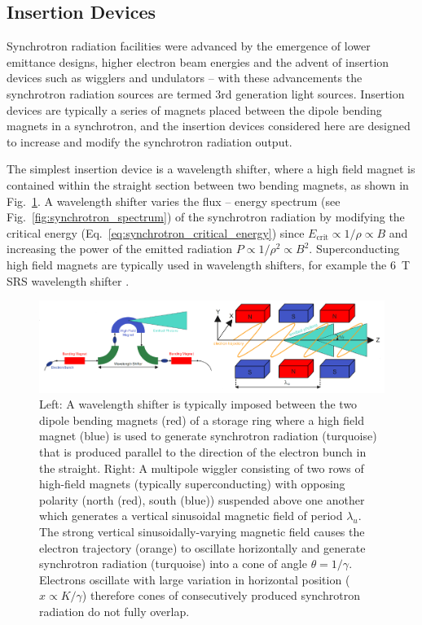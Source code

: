 \documentclass[../main.tex]{subfiles}
\begin{document}
\subsection{Insertion Devices}

Synchrotron radiation facilities were advanced by the emergence of lower emittance designs, higher electron beam energies and the advent of insertion devices such as wigglers and undulators -- with these advancements the synchrotron radiation sources are termed 3rd generation light sources. Insertion devices are typically a series of magnets placed between the dipole bending magnets in a synchrotron, and the insertion devices considered here are designed to increase and modify the synchrotron radiation output. 

The simplest insertion device is a wavelength shifter, where a high field magnet is contained within the straight section between two bending magnets, as shown in Fig.~\ref{fig:wavelength_shifter_wiggler}. A wavelength shifter varies the flux -- energy spectrum (see Fig.~\ref{fig:synchrotron_spectrum}) of the synchrotron radiation by modifying the critical energy (Eq.~\ref{eq:synchrotron_critical_energy}) since $E_{\mathrm{crit}} \propto 1/\rho \propto B$ and increasing the power of the emitted radiation $P \propto 1/\rho^{2} \propto B^{2}$. Superconducting high field magnets are typically used in wavelength shifters, for example the 6~\si{\tesla} SRS wavelength shifter \cite{poole1989second}.   
\begin{figure}[!h]
\centering
\includegraphics[width=\textwidth]{Figures/Introduction/wavelength_shifter_wiggler.pdf}
\caption{Left: A wavelength shifter is typically imposed between the two dipole bending magnets (red) of a storage ring where a high field magnet (blue) is used to generate synchrotron radiation (turquoise) that is produced parallel to the direction of the electron bunch in the straight. Right: A multipole wiggler consisting of two rows of high-field magnets (typically superconducting) with opposing polarity (north (red), south (blue)) suspended above one another which generates a vertical sinusoidal magnetic field of period $\lambda_{u}$. The strong vertical sinusoidally-varying magnetic field causes the electron trajectory (orange) to oscillate horizontally and generate synchrotron radiation (turquoise) into a cone of angle $\theta = 1/\gamma$. Electrons oscillate with large variation in horizontal position ($x \propto K/\gamma$) therefore cones of consecutively produced synchrotron radiation do not fully overlap. }
\label{fig:wavelength_shifter_wiggler}
\end{figure}
\end{document}
